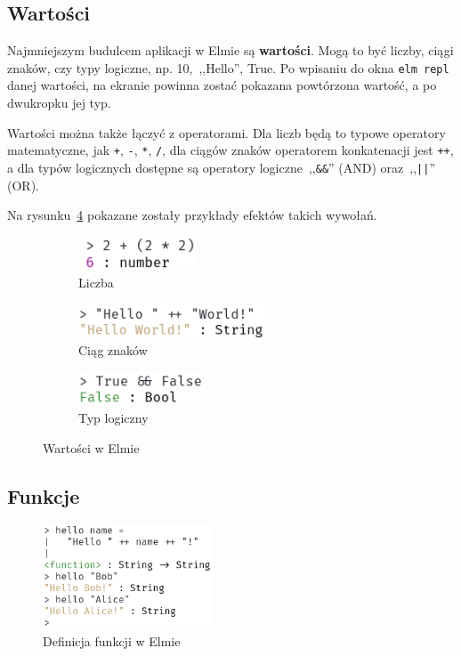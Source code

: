 \documentclass[twoside,a4paper]{report}
\begin{document}
\subsection{Wartości}
Najmniejszym budulcem aplikacji w Elmie są \textbf{wartości}.
Mogą to być liczby, ciągi znaków, czy typy logiczne, np. 10,~,,Hello'', True.
Po wpisaniu do okna \texttt{elm repl} danej wartości, na ekranie powinna zostać pokazana powtórzona wartość, a po dwukropku jej typ.

Wartości można także łączyć z operatorami.
Dla liczb będą to typowe operatory matematyczne, jak \texttt{+}, \texttt{-}, \texttt{*}, \texttt{/}, dla ciągów znaków operatorem konkatenacji jest \texttt{++}, a dla typów logicznych dostępne są operatory logiczne~,,\texttt{\&\&}'' (AND) oraz~,,\texttt{||}'' (OR).

Na rysunku~\ref{fig:repl_values} pokazane zostały przykłady efektów takich wywołań.

\begin{figure}[H]
    \centering
    \begin{subfigure}{.29\textwidth}
        \centering
        \includegraphics[height=1cm]{img/repl_number}
        \caption{Liczba}\label{fig:repl_number}
    \end{subfigure}
    \begin{subfigure}{.4\textwidth}
        \centering
        \includegraphics[height=1cm]{img/repl_string}
        \caption{Ciąg znaków}\label{fig:repl_string}
    \end{subfigure}
    \begin{subfigure}{.29\textwidth}
        \centering
        \includegraphics[height=1cm]{img/repl_bool}
        \caption{Typ logiczny}\label{fig:repl_bool}
    \end{subfigure}
    \caption{Wartości w Elmie}\label{fig:repl_values}
\end{figure}

\subsection{Funkcje}
\begin{figure}
    \centering
    \includegraphics[width=0.45\textwidth]{img/repl_func}
    \caption{Definicja funkcji w Elmie}\label{fig:repl_func}
\end{figure}
\end{document}
